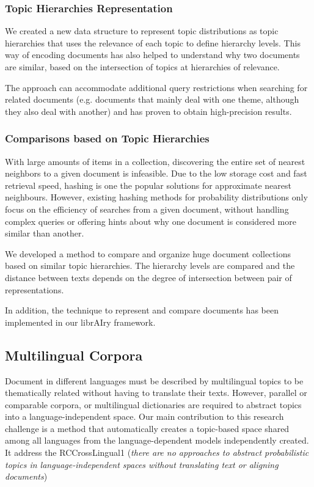 \subsubsection{Topic Hierarchies Representation}

We created a new data structure to represent topic distributions as topic hierarchies that uses the relevance of each topic to define hierarchy levels. This way of encoding documents has also helped to understand why two documents are similar, based on the intersection of topics at hierarchies of relevance.

The approach can accommodate additional query restrictions when searching for related documents (e.g. documents that mainly deal with one theme, although they also deal with another) and has proven to obtain high-precision results. 

\subsubsection{Comparisons based on Topic Hierarchies}

With large amounts of items in a collection, discovering the entire set of nearest neighbors to a given document is infeasible. Due to the low storage cost and fast retrieval speed, hashing is one the popular solutions for approximate nearest neighbours. However, existing hashing methods for probability distributions only focus on the efficiency of searches from a given document, without handling complex queries or offering hints about why one document is considered more similar than another.

We developed a method to compare and organize huge document collections based on similar topic hierarchies. The hierarchy levels are compared and the distance between texts depends on the degree of intersection between pair of representations.

In addition, the technique to represent and compare documents has been implemented in our librAIry framework.

\subsection{Multilingual Corpora}

Document in different languages must be described by multilingual topics to be thematically related without having to translate their texts. However, parallel or comparable corpora, or multilingual dictionaries are required to abstract topics into a language-independent space. Our main contribution to this research challenge is a method that automatically creates a topic-based space shared among all languages from the language-dependent models independently created. It address the RCCrossLingual1 (\textit{there are no approaches to abstract probabilistic topics in language-independent spaces without translating text or aligning documents}) 

